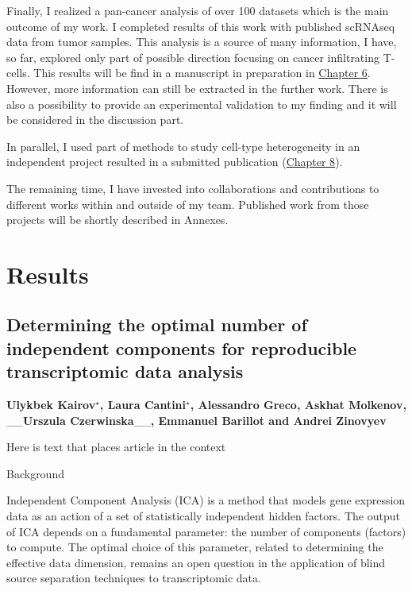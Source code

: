 \documentclass[12pt,]{book}
\theoremstyle{definition}
\theoremstyle{definition}
\theoremstyle{definition}
\theoremstyle{remark}
\begin{document}
Finally, I realized a pan-cancer analysis of over 100 datasets which is
the main outcome of my work. I completed results of this work with
published scRNAseq data from tumor samples. This analysis is a source of
many information, I have, so far, explored only part of possible
direction focusing on cancer infiltrating T-cells. This results will be
find in a manuscript in preparation in
\protect\hyperlink{deconica}{Chapter 6}. However, more information can
still be extracted in the further work. There is also a possibility to
provide an experimental validation to my finding and it will be
considered in the discussion part.

In parallel, I used part of methods to study cell-type heterogeneity in
an independent project resulted in a submitted publication
(\protect\hyperlink{maps}{Chapter 8}).

The remaining time, I have invested into collaborations and
contributions to different works within and outside of my team.
Published work from those projects will be shortly described in Annexes.

\hypertarget{part-results}{%
\part{Results}\label{part-results}}

\hypertarget{mstd}{%
\chapter{Determining the optimal number of independent components for
reproducible transcriptomic data analysis}\label{mstd}}


\textbf{Ulykbek Kairov\(^\star\), Laura Cantini\(^\star\), Alessandro
Greco, Askhat Molkenov, }\_\_\textbf{Urszula Czerwinska}\_\_\textbf{,
Emmanuel Barillot and Andrei Zinovyev}

Here is text that places article in the context

Background

Independent Component Analysis (ICA) is a method that models gene
expression data as an action of a set of statistically independent
hidden factors. The output of ICA depends on a fundamental parameter:
the number of components (factors) to compute. The optimal choice of
this parameter, related to determining the effective data dimension,
remains an open question in the application of blind source separation
techniques to transcriptomic data.
\end{document}
